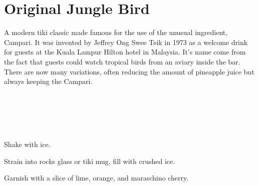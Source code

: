 \section[Jungle Bird]{Original Jungle Bird~\vegan}

\begin{recipestats}[
	servings=1,
	preptime=5~\minute,
	original=\citefield{originalJungleBird}{title} \cite{originalJungleBird},
]
\end{recipestats}


\begin{recipeabstract}
	A modern tiki classic made famous for the use of the unusual ingredient, Campari.
	It was invented by Jeffrey Ong Swee Teik in 1973 as a welcome drink for guests at the Kuala Lampur Hilton hotel in Malaysia\cite{cocktailSeminars2021}.
	It's name come from the fact that guests could watch tropical birds from an aviary inside the bar.
	There are now many variations, often reducing the amount of pineapple juice but always keeping the Campari.
\end{recipeabstract}


\begin{ingredientcolumns}[1]
	\begin{ingredientblock}
		\\
		\\
		\\
		\\
	\end{ingredientblock}
\end{ingredientcolumns}


\begin{preparation}
\item Shake with ice.
\item Strain into rocks glass or tiki mug, fill with crushed ice.
\item Garnish with a slice of lime, orange, and maraschino cherry.
\end{preparation}


\recipeend
